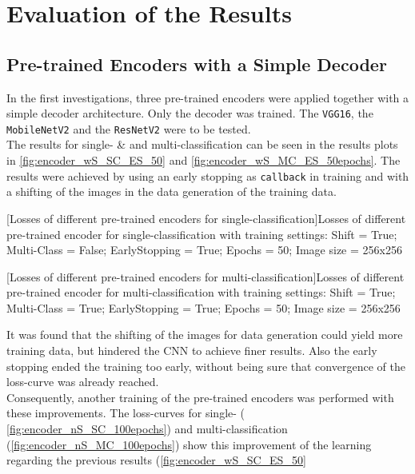 \newpage
\section{Evaluation of the Results}
\subsection{Pre-trained Encoders with a Simple Decoder}
In the first investigations, three pre-trained encoders were applied together with a simple decoder architecture. Only the decoder was trained. The \verb|VGG16|, the \verb|MobileNetV2| and the \verb|ResNetV2| were to be tested.\\
The results for single- \& and multi-classification can be seen in the results plots in \cref{fig:encoder_wS_SC_ES_50} and \cref{fig:encoder_wS_MC_ES_50epochs}. The results were achieved by using an early stopping as \verb|callback| in training and with a shifting of the images in the data generation of the training data.\\
\begin{minipage}{\textwidth}
	
	[Losses of different pre-trained encoders for single-classification]{Losses of different pre-trained encoder for single-classification with training settings: Shift = True; Multi-Class = False; EarlyStopping = True; Epochs = 50; Image size = 256x256}
	\label{fig:encoder_wS_SC_ES_50}
	\vspace{5mm}
\end{minipage}
\begin{minipage}{\textwidth}
	
	[Losses of different pre-trained encoders for multi-classification]{Losses of different pre-trained encoder for multi-classification with training settings: Shift = True; Multi-Class = True; EarlyStopping = True; Epochs = 50; Image size = 256x256}
	\label{fig:encoder_wS_MC_ES_50epochs}
	\vspace{5mm}
\end{minipage}
It was found that the shifting of the images for data generation could yield more training data, but hindered the CNN to achieve finer results. Also the early stopping ended the training too early, without being sure that convergence of the loss-curve was already reached.\\
Consequently, another training of the pre-trained encoders was performed with these improvements. The loss-curves for single- ( \cref{fig:encoder_nS_SC_100epochs}) and multi-classification (\cref{fig:encoder_nS_MC_100epochs}) show this improvement of the learning regarding the previous results (\cref{fig:encoder_wS_SC_ES_50}
